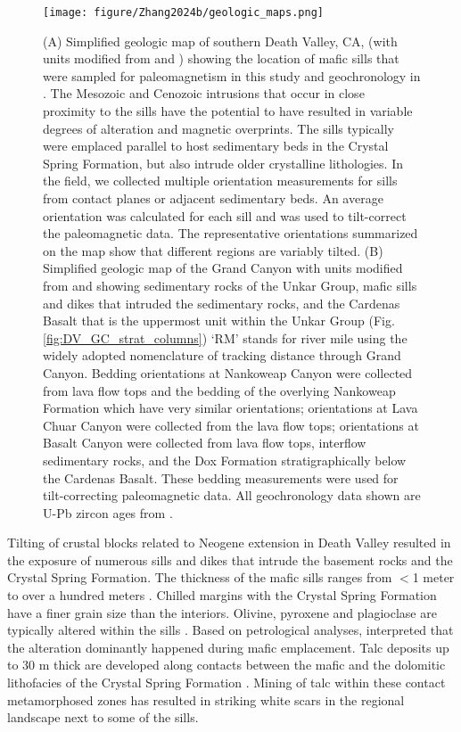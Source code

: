 \begin{figure}[h!]
\centering
\texttt{[image: figure/Zhang2024b/geologic\_maps.png]}
\caption[Simplified geologic maps of the Death Valley area and the Grand Canyon area]{\footnotesize (A) Simplified geologic map of southern Death Valley, CA, (with units modified from \cite{Workman2003a} and \cite{Wrucke2007a}) showing the location of mafic sills that were sampled for paleomagnetism in this study and geochronology in \cite{Mohr2024a}. The Mesozoic and Cenozoic intrusions that occur in close proximity to the sills have the potential to have resulted in variable degrees of alteration and magnetic overprints. The sills typically were emplaced parallel to host sedimentary beds in the Crystal Spring Formation, but also intrude older crystalline lithologies. In the field, we collected multiple orientation measurements for sills from contact planes or adjacent sedimentary beds. An average orientation was calculated for each sill and was used to tilt-correct the paleomagnetic data. The representative orientations summarized on the map show that different regions are variably tilted. (B) Simplified geologic map of the Grand Canyon with units modified from \cite{Billingsley2000a} and \cite{Billingsley2003a} showing sedimentary rocks of the Unkar Group, mafic sills and dikes that intruded the sedimentary rocks, and the Cardenas Basalt that is the uppermost unit within the Unkar Group (Fig. \ref{fig:DV_GC_strat_columns}) `RM' stands for river mile using the widely adopted nomenclature of tracking distance through Grand Canyon. Bedding orientations at Nankoweap Canyon were collected from lava flow tops and the bedding of the overlying Nankoweap Formation which have very similar orientations; orientations at Lava Chuar Canyon were collected from the lava flow tops; orientations at Basalt Canyon were collected from lava flow tops, interflow sedimentary rocks, and the Dox Formation stratigraphically below the Cardenas Basalt. These bedding measurements were used for tilt-correcting paleomagnetic data. All geochronology data shown are U-Pb zircon ages from \cite{Mohr2024a}.}
\label{fig:geologic_maps}
\end{figure}

Tilting of crustal blocks related to Neogene extension in Death Valley resulted in the exposure of numerous sills and dikes that intrude the basement rocks and the Crystal Spring Formation. The thickness of the mafic sills ranges from $<$1 meter to over a hundred meters \citep{Wright1968a, Hammond1983a}. Chilled margins with the Crystal Spring Formation have a finer grain size than the interiors. Olivine, pyroxene and plagioclase are typically altered within the sills \citep{Hammond1983a}. Based on petrological analyses, \cite{Hammond1983a} interpreted that the alteration dominantly happened during mafic emplacement. Talc deposits up to 30 m thick are developed along contacts between the mafic and the dolomitic lithofacies of the Crystal Spring Formation \citep{Wright1968a}. Mining of talc within these contact metamorphosed zones has resulted in striking white scars in the regional landscape next to some of the sills.

